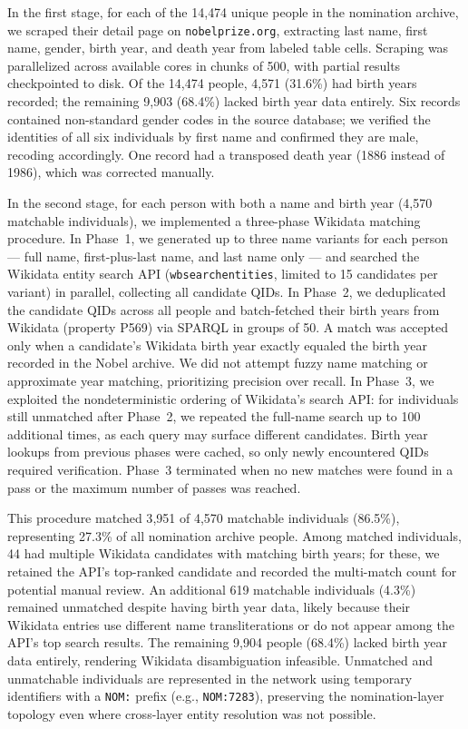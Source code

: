 \documentclass[11pt]{article}
\begin{document}
In the first stage, for each of the 14{,}474 unique people in the nomination archive, we scraped their detail page on \texttt{nobelprize.org}, extracting last name, first name, gender, birth year, and death year from labeled table cells. Scraping was parallelized across available cores in chunks of 500, with partial results checkpointed to disk. Of the 14{,}474 people, 4{,}571 (31.6\%) had birth years recorded; the remaining 9{,}903 (68.4\%) lacked birth year data entirely. Six records contained non-standard gender codes in the source database; we verified the identities of all six individuals by first name and confirmed they are male, recoding accordingly. One record had a transposed death year (1886 instead of 1986), which was corrected manually.

In the second stage, for each person with both a name and birth year (4{,}570 matchable individuals), we implemented a three-phase Wikidata matching procedure. In Phase~1, we generated up to three name variants for each person --- full name, first-plus-last name, and last name only --- and searched the Wikidata entity search API (\texttt{wbsearchentities}, limited to 15 candidates per variant) in parallel, collecting all candidate QIDs. In Phase~2, we deduplicated the candidate QIDs across all people and batch-fetched their birth years from Wikidata (property P569) via SPARQL in groups of 50. A match was accepted only when a candidate's Wikidata birth year exactly equaled the birth year recorded in the Nobel archive. We did not attempt fuzzy name matching or approximate year matching, prioritizing precision over recall. In Phase~3, we exploited the nondeterministic ordering of Wikidata's search API: for individuals still unmatched after Phase~2, we repeated the full-name search up to 100 additional times, as each query may surface different candidates. Birth year lookups from previous phases were cached, so only newly encountered QIDs required verification. Phase~3 terminated when no new matches were found in a pass or the maximum number of passes was reached.

This procedure matched 3{,}951 of 4{,}570 matchable individuals (86.5\%), representing 27.3\% of all nomination archive people. Among matched individuals, 44 had multiple Wikidata candidates with matching birth years; for these, we retained the API's top-ranked candidate and recorded the multi-match count for potential manual review. An additional 619 matchable individuals (4.3\%) remained unmatched despite having birth year data, likely because their Wikidata entries use different name transliterations or do not appear among the API's top search results. The remaining 9{,}904 people (68.4\%) lacked birth year data entirely, rendering Wikidata disambiguation infeasible. Unmatched and unmatchable individuals are represented in the network using temporary identifiers with a \texttt{NOM:} prefix (e.g., \texttt{NOM:7283}), preserving the nomination-layer topology even where cross-layer entity resolution was not possible.
\end{document}
